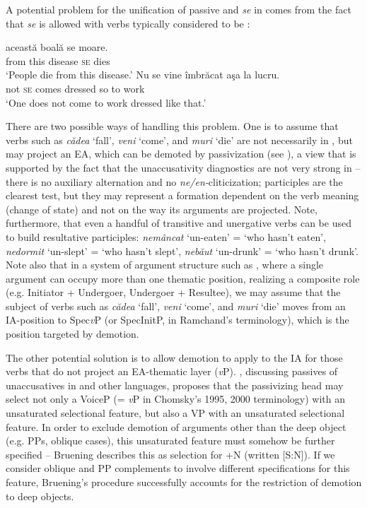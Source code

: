 \documentclass[output=paper]{langsci/langscibook}
\begin{document}
A potential problem for the unification of passive and  \textit{se} in  comes from the fact that  \textit{se} is allowed with verbs typically considered to be :

\ea%
    \label{ex:giurgea:11}
    \ea
     această boală    se  moare.\\
         from  this       disease \textsc{se} dies\\
    \glt ‘People die from this disease.’
    \ex
    \gll Nu se vine     îmbrăcat aşa la lucru.\\
         not \textsc{se} comes dressed  so   to work\\
    \glt ‘One does not come to work dressed like that.’
    \z
\z    
 
There are two possible ways of handling this problem. One is to assume that  verbs such as \textit{cădea} ‘fall’, \textit{veni} ‘come’, and \textit{muri} ‘die’ are not necessarily  in , but may project an EA, which can be demoted by passivization (see \citealt{Dobrovie-Sorin1987,Dobrovie-Sorin1994}), a view that is supported by the fact that the unaccusativity diagnostics are not very strong in  – there is no auxiliary alternation and no \textit{ne\slash en-}cliticization;  participles are the clearest test, but they may represent a formation dependent on the verb meaning (change of state) and not on the way its arguments are projected. Note, furthermore, that even a handful of transitive and unergative verbs can be used to build resultative participles: \textit{nemâncat} ‘un-eaten’ = ‘who hasn’t eaten’, \textit{nedormit} ‘un-slept’ = ‘who hasn’t slept’, \textit{nebăut} ‘un-drunk’ = ‘who hasn’t drunk’. Note also that in a system of argument structure such as , where a single argument can occupy more than one thematic position, realizing a composite role (e.g. Initiator + Undergoer, Undergoer + Resultee), we may assume that the subject of verbs such as \textit{cădea} ‘fall’, \textit{veni} ‘come’, and \textit{muri} ‘die’ moves from an IA-position to Spec\textit{v}P (or SpecInitP, in Ramchand’s terminology), which is the position targeted by demotion.   

  The other potential solution is to allow demotion to apply to the IA for those verbs that do not project an EA-thematic layer (\textit{v}P). \citet{Bruening2012}, discussing passives of unaccusatives in  and other languages, proposes that the passivizing head may select not only a VoiceP (= \textit{v}P in Chomsky’s 1995, 2000 terminology) with an unsaturated selectional feature, but also a VP with an unsaturated selectional feature. In order to exclude demotion of arguments other than the deep object (e.g. PPs, oblique cases), this unsaturated feature must somehow be further specified – Bruening describes this as selection for +N (written [S:N]). If we consider oblique and PP complements to involve different specifications for this feature, Bruening’s procedure successfully accounts for the restriction of demotion to deep objects. 
\end{document}
